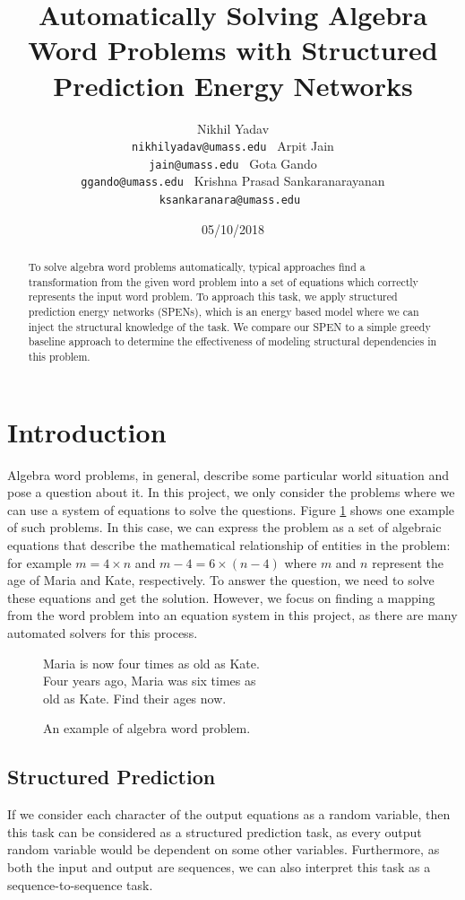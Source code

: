 \documentclass[11pt,letterpaper]{article}
\title{Automatically Solving Algebra Word Problems with Structured Prediction Energy Networks}
\author{Nikhil Yadav\\
  {\tt nikhilyadav@umass.edu } \And Arpit Jain\\ {\tt jain@umass.edu }  \And Gota Gando\\ {\tt ggando@umass.edu } \AND Krishna Prasad Sankaranarayanan\\ {\tt ksankaranara@umass.edu }}
\date{05/10/2018}
\begin{document}
\maketitle

\begin{abstract}
To solve algebra word problems automatically, typical approaches find a transformation from the given word problem into a set of equations which correctly represents the input word problem. To approach this task, we apply structured prediction energy networks (SPENs), which is an energy based model where we can inject the structural knowledge of the task. We compare our SPEN to a simple greedy baseline approach to determine the effectiveness of modeling structural dependencies in this problem.
\end{abstract}
\section{Introduction}
Algebra word problems, in general, describe some particular world situation and pose a question about it. In this project, we only consider the problems where we can use a system of equations to solve the questions. Figure \ref{algebra-example} shows one example of such problems. In this case, we can express the problem as a set of algebraic equations that describe the mathematical relationship of entities in the problem: for example $m = 4 \times n$ and $m-4 = 6 \times (n-4)$ where $m$ and $n$ represent the age of Maria and Kate, respectively. To answer the question, we need to solve these equations and get the solution. However, we focus on finding a mapping from the word problem into an equation system in this project, as there are many automated solvers for this process.
\begin{figure}[ht]
	\centering
	Maria is now four times as old as Kate.\\
Four years ago, Maria was six times as\\
old as Kate. Find their ages now.\\
	\caption{An example of algebra word problem.}
    \label{algebra-example}
\end{figure}
\subsection{Structured Prediction}
If we consider each character of the output equations as a random variable, then this task can be considered as a structured prediction task, as every output random variable would be dependent on some other variables. Furthermore, as both the input and output are sequences, we can also interpret this task as a sequence-to-sequence task.
\end{document}
